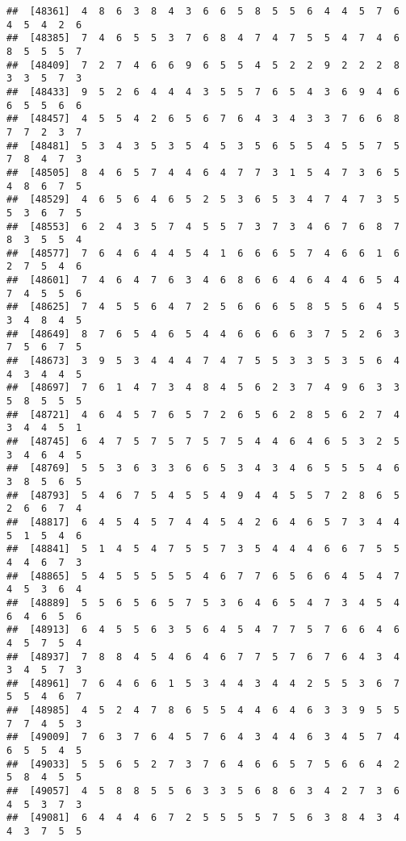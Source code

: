\documentclass[
]{book}
\begin{document}
\begin{verbatim}
##  [48361]  4  8  6  3  8  4  3  6  6  5  8  5  5  6  4  4  5  7  6  4  5  4  2  6
##  [48385]  7  4  6  5  5  3  7  6  8  4  7  4  7  5  5  4  7  4  6  8  5  5  5  7
##  [48409]  7  2  7  4  6  6  9  6  5  5  4  5  2  2  9  2  2  2  8  3  3  5  7  3
##  [48433]  9  5  2  6  4  4  4  3  5  5  7  6  5  4  3  6  9  4  6  6  5  5  6  6
##  [48457]  4  5  5  4  2  6  5  6  7  6  4  3  4  3  3  7  6  6  8  7  7  2  3  7
##  [48481]  5  3  4  3  5  3  5  4  5  3  5  6  5  5  4  5  5  7  5  7  8  4  7  3
##  [48505]  8  4  6  5  7  4  4  6  4  7  7  3  1  5  4  7  3  6  5  4  8  6  7  5
##  [48529]  4  6  5  6  4  6  5  2  5  3  6  5  3  4  7  4  7  3  5  5  3  6  7  5
##  [48553]  6  2  4  3  5  7  4  5  5  7  3  7  3  4  6  7  6  8  7  8  3  5  5  4
##  [48577]  7  6  4  6  4  4  5  4  1  6  6  6  5  7  4  6  6  1  6  2  7  5  4  6
##  [48601]  7  4  6  4  7  6  3  4  6  8  6  6  4  6  4  4  6  5  4  7  4  5  5  6
##  [48625]  7  4  5  5  6  4  7  2  5  6  6  6  5  8  5  5  6  4  5  3  4  8  4  5
##  [48649]  8  7  6  5  4  6  5  4  4  6  6  6  6  3  7  5  2  6  3  7  5  6  7  5
##  [48673]  3  9  5  3  4  4  4  7  4  7  5  5  3  3  5  3  5  6  4  4  3  4  4  5
##  [48697]  7  6  1  4  7  3  4  8  4  5  6  2  3  7  4  9  6  3  3  5  8  5  5  5
##  [48721]  4  6  4  5  7  6  5  7  2  6  5  6  2  8  5  6  2  7  4  3  4  4  5  1
##  [48745]  6  4  7  5  7  5  7  5  7  5  4  4  6  4  6  5  3  2  5  3  4  6  4  5
##  [48769]  5  5  3  6  3  3  6  6  5  3  4  3  4  6  5  5  5  4  6  3  8  5  6  5
##  [48793]  5  4  6  7  5  4  5  5  4  9  4  4  5  5  7  2  8  6  5  2  6  6  7  4
##  [48817]  6  4  5  4  5  7  4  4  5  4  2  6  4  6  5  7  3  4  4  5  1  5  4  6
##  [48841]  5  1  4  5  4  7  5  5  7  3  5  4  4  4  6  6  7  5  5  4  4  6  7  3
##  [48865]  5  4  5  5  5  5  5  4  6  7  7  6  5  6  6  4  5  4  7  4  5  3  6  4
##  [48889]  5  5  6  5  6  5  7  5  3  6  4  6  5  4  7  3  4  5  4  6  4  6  5  6
##  [48913]  6  4  5  5  6  3  5  6  4  5  4  7  7  5  7  6  6  4  6  4  5  7  5  4
##  [48937]  7  8  8  4  5  4  6  4  6  7  7  5  7  6  7  6  4  3  4  3  4  5  7  3
##  [48961]  7  6  4  6  6  1  5  3  4  4  3  4  4  2  5  5  3  6  7  5  5  4  6  7
##  [48985]  4  5  2  4  7  8  6  5  5  4  4  6  4  6  3  3  9  5  5  7  7  4  5  3
##  [49009]  7  6  3  7  6  4  5  7  6  4  3  4  4  6  3  4  5  7  4  6  5  5  4  5
##  [49033]  5  5  6  5  2  7  3  7  6  4  6  6  5  7  5  6  6  4  2  5  8  4  5  5
##  [49057]  4  5  8  8  5  5  6  3  3  5  6  8  6  3  4  2  7  3  6  4  5  3  7  3
##  [49081]  6  4  4  4  6  7  2  5  5  5  5  7  5  6  3  8  4  3  4  4  3  7  5  5

\end{verbatim}
\end{document}
